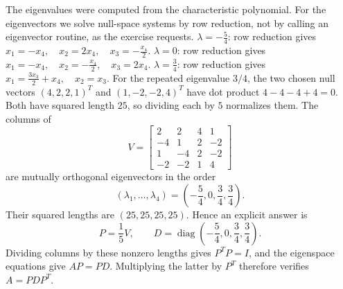 The eigenvalues were computed from the characteristic polynomial. For
the eigenvectors we solve null-space systems by row reduction, not by
calling an eigenvector routine, as the exercise requests.
$\lambda=- \frac{5}{4}$: row reduction gives \(x_{1}=- x_{4},\quad x_{2}=2 x_{4},\quad x_{3}=- \frac{x_{4}}{2}\).
$\lambda=0$: row reduction gives \(x_{1}=- x_{4},\quad x_{2}=- \frac{x_{4}}{2},\quad x_{3}=2 x_{4}\).
$\lambda=\frac{3}{4}$: row reduction gives \(x_{1}=\frac{3 x_{3}}{2} + x_{4},\quad x_{2}=x_{3}\).
For the repeated eigenvalue $3/4$, the two chosen null vectors
$(4,2,2,1)^T$ and $(1,-2,-2,4)^T$ have dot product $4-4-4+4=0$.
Both have squared length $25$, so dividing each by $5$ normalizes them.
The columns of
\[
 V=\begin{bmatrix}2&2&4&1\\-4&1&2&-2\\1&-4&2&-2\\-2&-2&1&4\end{bmatrix}
\]
are mutually orthogonal eigenvectors in the order
\[
 (\lambda_1,\ldots,\lambda_4)=(- \frac{5}{4},0,\frac{3}{4},\frac{3}{4}).
\]
Their squared lengths are $(25,25,25,25)$. Hence an explicit answer is
\[
 P=\frac1{5}V,\qquad
 D=\operatorname{diag}(- \frac{5}{4},0,\frac{3}{4},\frac{3}{4}).
\]
Dividing columns by these nonzero lengths gives $P^TP=I$, and the
eigenspace equations give $AP=PD$. Multiplying the latter by $P^T$
therefore verifies $A=PDP^T$.

